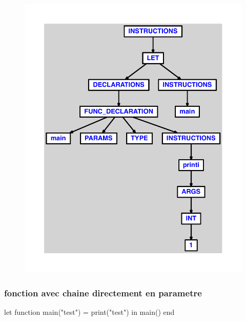 \documentclass{article}
\begin{document}
\begin{figure}[H]\centering\includegraphics[max width=\textwidth]{ast/ast_219.pdf}\end{figure}\subsubsection{fonction avec chaine directement en parametre}
\begin{verbatimtab}
let
	function main("test") = print("test")
in main() end
\end{verbatimtab}
\end{document}
